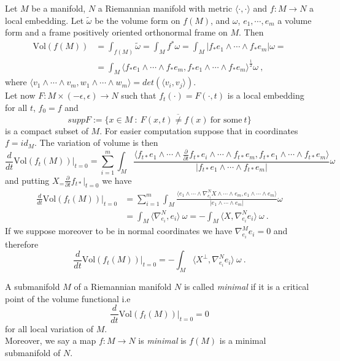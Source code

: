Let $M$ be a manifold, $N$ a Riemannian manifold with metric $\langle \cdot, \cdot \rangle$ and $f:M \to N$ a local embedding. Let $\widetilde{\omega}$ be the volume form on $f(M)$, and $\omega$, $e_1, \cdots , e_m$ a volume form and a frame positively oriented orthonormal frame on $M$. Then
\[
\begin{split}
    \text{Vol}(f(M)) & = \int_{f(M)} \widetilde{\omega} = \int_M f^* \omega  = \int_M | f_* e_1 \wedge \cdots \wedge f_* e_m | \omega = \\
    & = \int_M \langle f_* e_1 \wedge \cdots \wedge f_* e_m ,f_* e_1 \wedge \cdots \wedge f_* e_m \rangle ^{\frac{1}{2}} \omega \ ,
\end{split}
\]
where $\langle v_1 \wedge \cdots \wedge v_m , w_1 \wedge \cdots \wedge w_m \rangle = det(\langle v_i,v_j \rangle)$.\\
Let now $F: M \times (-\epsilon, \epsilon) \to N$ such that $f_t(\cdot) = F(\cdot,t)$ is a local embedding for all $t$, $f_0 = f$ and
\[ supp F:= \overline{ \{ x\in M \ :\ F(x,t) \neq f(x) \ \text{for some} \ t\} }  \]
is a compact subset of $M$. For easier computation suppose that in coordinates $f = id_M$. The variation of volume is then
\[
    \frac{d}{dt} \text{Vol}(f_t(M)) \Big|_{t=0} = \sum_{i=1}^m \int_M \frac{ \langle f_{t*} e_1 \wedge \cdots \wedge \frac{\partial}{\partial t} f_{t*} e_i \wedge \cdots \wedge f_{t*} e_m ,f_{t*} e_1 \wedge \cdots \wedge f_{t*} e_m \rangle }{| f_{t*} e_1 \wedge \cdots \wedge f_{t*} e_m |} \omega
\]
and putting $X_=\frac{\partial}{\partial t} f_{t*} |_{t=0} $ we have
\[
\begin{split}
    \frac{d}{dt} \text{Vol}(f_t(M)) \Big|_{t=0} & = \sum_{i=1}^m \int_M \frac{ \langle e_1 \wedge \cdots \wedge \nabla^N_{e_i} X \wedge \cdots \wedge e_m , e_1 \wedge \cdots \wedge e_m \rangle }{| e_1 \wedge \cdots \wedge e_m |} \omega \\
    & = \int_M \langle \nabla^N_{e_i}, e_i \rangle \ \omega = - \int_M \langle X, \nabla^N_{e_i} e_i \rangle \ \omega \ .
\end{split}
\]
If we suppose moreover to be in normal coordinates we have $\nabla^M_{e_i} e_i = 0$ and therefore
\[
   \frac{d}{dt} \text{Vol}(f_t(M)) \Big|_{t=0}  = - \int_M \langle X^\perp, \nabla^N_{e_i} e_i \rangle \ \omega \ . 
\]
\begin{definition}
    A submanifold $M$ of a Riemannian manifold $N$ is called \textit{minimal} if it is a critical point of the volume functional i.e
    \[
        \frac{d}{dt} \text{Vol}(f_t(M)) \Big|_{t=0}  = 0
    \]
    for all local variation of $M$.\\
    Moreover, we say a map $f:M \to N$ is \textit{minimal} is $f(M)$ is a minimal submanifold of $N$.
\end{definition}
